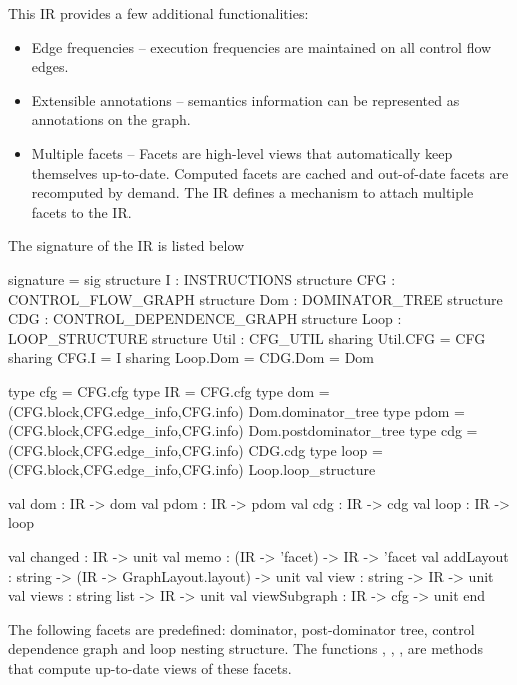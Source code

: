 This IR provides a few additional functionalities:
\begin{itemize}
  \item Edge frequencies -- execution frequencies
are maintained on all control flow edges.
  \item Extensible annotations -- semantics information can be 
       represented as annotations on the graph. 
  \item Multiple facets -- 
   Facets are high-level views that automatically keep themselves
up-to-date.  Computed facets are cached and out-of-date facets 
are recomputed by demand.
The IR defines a mechanism to attach multiple facets to the IR.
\end{itemize}

The signature of the IR is listed below
\begin{SML}
 signature  = sig
   structure I    : INSTRUCTIONS
   structure CFG  : CONTROL_FLOW_GRAPH
   structure Dom  : DOMINATOR_TREE
   structure CDG  : CONTROL_DEPENDENCE_GRAPH
   structure Loop : LOOP_STRUCTURE
   structure Util : CFG_UTIL
      sharing Util.CFG = CFG
      sharing CFG.I = I 
      sharing Loop.Dom = CDG.Dom = Dom
  
   type cfg  = CFG.cfg  
   type IR   = CFG.cfg  
   type dom  = (CFG.block,CFG.edge_info,CFG.info) Dom.dominator_tree
   type pdom = (CFG.block,CFG.edge_info,CFG.info) Dom.postdominator_tree
   type cdg  = (CFG.block,CFG.edge_info,CFG.info) CDG.cdg
   type loop = (CFG.block,CFG.edge_info,CFG.info) Loop.loop_structure
 
   val dom   : IR -> dom
   val pdom  : IR -> pdom
   val cdg   : IR -> cdg
   val loop  : IR -> loop

   val changed : IR -> unit  
   val memo : (IR -> 'facet) -> IR -> 'facet
   val addLayout : string -> (IR -> GraphLayout.layout) -> unit
   val view : string -> IR -> unit      
   val views : string list -> IR -> unit      
   val viewSubgraph : IR -> cfg -> unit 
 end
\end{SML}

The following facets are predefined: dominator, post-dominator tree,
control dependence graph and loop nesting structure.
The functions , , , 
are  methods that
compute up-to-date views of these facets.

